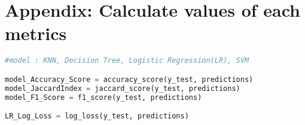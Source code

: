 \documentclass[12pt]{article}
\begin{document}
\section{Appendix: Calculate values of each metrics}
\label{appendix:metrics}
\begin{lstlisting}[language=Python]
#model : KNN, Decision Tree, Logistic Regression(LR), SVM

model_Accuracy_Score = accuracy_score(y_test, predictions)
model_JaccardIndex = jaccard_score(y_test, predictions)
model_F1_Score = f1_score(y_test, predictions)

LR_Log_Loss = log_loss(y_test, predictions)
\end{lstlisting}
\end{document}

